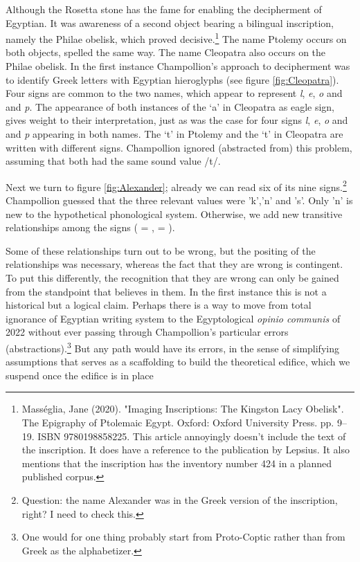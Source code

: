 Although the Rosetta stone has the fame for enabling the decipherment of Egyptian. It was awareness of a second object bearing a bilingual inscription, namely the Philae obelisk, which proved decisive.\footnote{Masséglia, Jane (2020). "Imaging Inscriptions: The Kingston Lacy Obelisk". The Epigraphy of Ptolemaic Egypt. Oxford: Oxford University Press. pp. 9–19. ISBN 9780198858225. This article annoyingly doesn't include the text of the inscription. It does have a reference to the publication by Lepsius. It also mentions that the inscription has the inventory number 424 in a planned published corpus.} The name Ptolemy occurs on both objects, spelled the same way. The name Cleopatra also occurs on the Philae obelisk. In the first instance Champollion's approach to decipherment was to identify Greek letters with Egyptian hieroglyphs (see figure \ref{fig:Cleopatra}). 
Four signs are common to the two names, which appear to represent \textit{l}, \textit{e}, \textit{o} and and \textit{p}. 
The appearance of both instances of the `a' in Cleopatra as eagle sign, gives weight to their interpretation, just as was the case for four signs  \textit{l}, \textit{e}, \textit{o} and and \textit{p} appearing in both names. 
The `t' in Ptolemy and the `t' in Cleopatra are written with different signs. Champollion ignored (abstracted from) this problem, assuming that both had the same sound value /t/. 


Next we turn to 
figure \ref{fig:Alexander};
already we can read six of its nine signs.\footnote{Question: the name Alexander was in the Greek version of the inscription, right? I need to check this.}
Champollion guessed that the three relevant values were 'k','n' and 's'. Only 'n' is new to the hypothetical phonological system. Otherwise, we add new transitive relationships among the signs ({} = {}, {} = {}). 

Some of these relationships turn out to be wrong, but the positing of the relationships was necessary, whereas the fact that they are wrong is contingent. To put this differently, the recognition that they are wrong can only be gained from the standpoint that believes in them. 
In the first instance this is not a historical but a logical claim. 
Perhaps there is a way to move from total ignorance of Egyptian writing system to the Egyptological \textit{opinio communis} of 2022 without ever passing through Champollion's particular errors (abstractions).\footnote{One would for one thing probably start from Proto-Coptic rather than from Greek as the alphabetizer.} 
But any path would have its errors, in the sense of simplifying assumptions that serves as a scaffolding to build the theoretical edifice, which we suspend once the edifice is in place 
\citet[60-72]{Pope1999decipherment}

